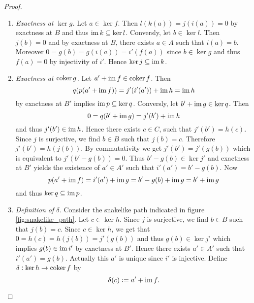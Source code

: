 \begin{proof}
	\begin{enumerate}[label = \textit{Step \arabic*:},wide = 0pt]
		\item \textit{Exactness at $\ker g$.} Let $a \in \ker f$. Then $l(k(a)) = j(i(a)) = 0$ by exactness at $B$ and thus $\im k \subseteq \ker l$. Conversly, let $b \in \ker l$. Then $j(b) = 0$ and by exactness at $B$, there exists $a \in A$ such that $i(a) = b$. Moreover $0 = g(b) = g(i(a)) = i'(f(a))$ since $b \in \ker g$ and thus $f(a) = 0$ by injectivity of $i'$. Hence $\ker j \subseteq \im k$.
		\item \textit{Exactness at $\coker g$.} Let $a' + \im f \in \coker f$. Then
			\begin{equation*}
				q(p(a' + \im f)) = j'(i'(a')) + \im h = \im h
			\end{equation*}
			\noindent by exactness at $B'$ implies $\im p \subseteq \ker q$. Conversly, let $b' + \im g \in \ker q$. Then 
			\begin{equation*}
				0 = q(b' + \im g) = j'(b') + \im h
			\end{equation*}
			\noindent and thus $j'(b') \in \im h$. Hence there exists $c \in C$, such that $j'(b') = h(c)$. Since $j$ is surjective, we find $b \in B$ such that $j(b) = c$. Therefore $j'(b') = h(j(b))$. By commutativity we get $j'(b') = j'(g(b))$ which is equivalent to $j'(b' - g(b)) = 0$. Thus $b' - g(b) \in \ker j'$ and exactness at $B'$ yields the existence of $a' \in A'$ such that $i'(a') = b' - g(b)$. Now
			\begin{equation*}
				p(a' + \im f) = i'(a') + \im g = b' - g(b) + \im g = b' + \im g
			\end{equation*}
			\noindent and thus $\ker q \subseteq \im p$.
		\item \textit{Definition of $\delta$.} Consider the snakelike path indicated in figure \ref{fig:snakelike_path}. Let $c \in \ker h$. Since $j$ is surjective, we find $b \in B$ such that $j(b) = c$. Since $c \in \ker h$, we get that $0 = h(c) = h(j(b)) = j'(g(b))$ and thus $g(b) \in \ker j'$ which implies $g(b) \in \im i'$ by exactness at $B'$. Hence there exists $a' \in A'$ such that $i'(a') = g(b)$. Actually this $a'$ is unique since $i'$ is injective. Define $\delta : \ker h \to \coker f$ by
			\begin{equation*}
				\delta(c) := a' + \im f.
			\end{equation*}
			\begin{figure}[h!tb]
				\centering
				\begin{subfigure}[b]{.5\textwidth}
					\begin{tikzcd}

\end{tikzcd}
\end{subfigure}
\end{figure}
\end{enumerate}
\end{proof}
